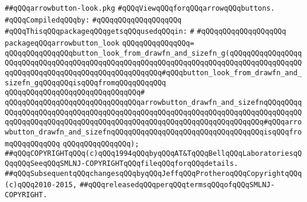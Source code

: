 \label{src/lib/x-kit/widget/old/leaf/arrowbutton-look.pkg}
\verb|##qQQqarrowbutton-look.pkg|\newline
\verb|#qQQqViewqQQqforqQQqarrowqQQqbuttons.|\newline
\newline
\verb|#qQQqCompiledqQQqby:|\newline
\verb|#qQQqqQQqqQQqqQQqqQQq|\newline
\newline
\newline
\newline
\newline
\newline
\newline
\verb|#qQQqThisqQQqpackageqQQqgetsqQQqusedqQQqin:|\newline
\verb|#|\newline
\verb|#qQQqqQQqqQQqqQQqqQQq|\newline
\newline
\newline
\verb|packageqQQqarrowbutton_look|\newline
\verb|qQQqqQQqqQQqqQQq=|\newline
\verb|qQQqqQQqqQQqqQQqbutton_look_from_drawfn_and_sizefn_g(qQQqqQQqqQQqqQQqqQQqqQQqqQQqqQQqqQQqqQQqqQQqqQQqqQQqqQQqqQQqqQQqqQQqqQQqqQQqqQQqqQQqqQQqqQQqqQQqqQQqqQQqqQQqqQQqqQQqqQQqqQQq#qQQqbutton_look_from_drawfn_and_sizefn_gqQQqqQQqisqQQqfromqQQqqQQqqQQq|\newline
\verb|qQQqqQQqqQQqqQQqqQQqqQQqqQQqqQQq#|\newline
\verb|qQQqqQQqqQQqqQQqqQQqqQQqqQQqqQQqarrowbutton_drawfn_and_sizefnqQQqqQQqqQQqqQQqqQQqqQQqqQQqqQQqqQQqqQQqqQQqqQQqqQQqqQQqqQQqqQQqqQQqqQQqqQQqqQQqqQQqqQQqqQQqqQQqqQQqqQQqqQQqqQQqqQQqqQQqqQQqqQQqqQQqqQQqqQQq#qQQqarrowbutton_drawfn_and_sizefnqQQqqQQqqQQqqQQqqQQqqQQqqQQqqQQqqQQqisqQQqfromqQQqqQQqqQQq|\newline
\verb|qQQqqQQqqQQqqQQq);|\newline
\newline
\newline
\verb|##qQQqCOPYRIGHTqQQq(c)qQQq1994qQQqbyqQQqAT&TqQQqBellqQQqLaboratoriesqQQqqQQqSeeqQQqSMLNJ-COPYRIGHTqQQqfileqQQqforqQQqdetails.|\newline
\verb|##qQQqSubsequentqQQqchangesqQQqbyqQQqJeffqQQqProtheroqQQqCopyrightqQQq(c)qQQq2010-2015,|\newline
\verb|##qQQqreleasedqQQqperqQQqtermsqQQqofqQQqSMLNJ-COPYRIGHT.|\newline

